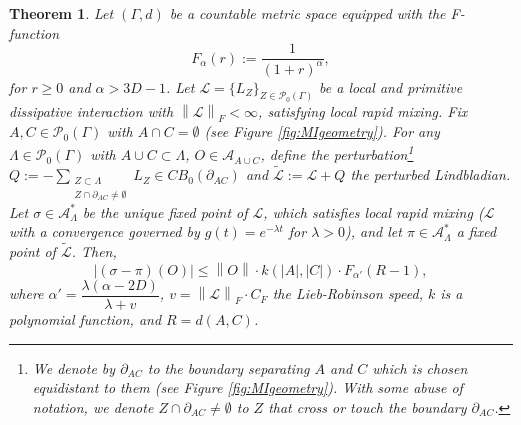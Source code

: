 \documentclass[10pt,a4paper]{amsart}
\newtheorem{thm}{Theorem}
\newcommand{\A}{\mathcal{A}}
\newcommand{\LL}{\widetilde{\Li}}
\newcommand{\La}{\Lambda}
\newcommand{\Li}{\mathcal{L}}
\newcommand{\abs}[1]{\left \vert#1\right\vert}
\newcommand{\norm}[1]{\left\lVert#1\right\rVert}
\newcommand{\normm}[2]{\left\lVert#1\right\rVert_{#2}}
\begin{document}
\begin{thm}\label{thm:clusteringBoundary}
    Let $(\Gamma,d)$ be a countable metric space equipped with the F-function\[F_\alpha(r):=\dfrac{1}{(1+r)^\alpha},\]for $r\geq0$ and $\alpha>3D-1$. Let $\Li=\{L_Z\}_{Z\in \mathcal{P}_0(\Gamma)}$ be a local and primitive dissipative interaction with $\normm{\Li}{F}<\infty$, satisfying local rapid mixing. Fix $A,C\in \mathcal{P}_0(\Gamma)$ with $A\cap C =\emptyset$ (see Figure \ref{fig:MIgeometry}). For any $\Lambda\in  \mathcal{P}_0(\Gamma)$ with $A\cup C \subset \Lambda$, $O\in \mathcal{A}_{A\cup C}$, define the perturbation\footnote{We denote by $\partial_{AC}$ to the boundary separating $A$ and $C$ which is chosen equidistant to them (see Figure \ref{fig:MIgeometry}). With some abuse of notation, we denote $Z\cap \partial_{AC}\neq \emptyset$ to $Z$ that cross or touch the boundary $\partial_{AC}$.} $Q:=-\sum\limits_{\substack{Z\subset \Lambda \\ Z\cap \partial_{AC}\neq \emptyset}}L_Z\in CB_0(\partial_{AC})$ and $\LL:=\Li+ Q $ the perturbed \textit{Lindbladian}.
Let $\sigma\in\A_\La^*$ be the unique fixed point of $\Li$, which satisfies local rapid mixing ($\Li$ with a convergence governed by $g(t)=e^{-\lambda t}$ for $\lambda >0$), and let $\pi\in\A_\La^*$ a fixed point of $\LL$. Then,
    \begin{equation}
        \abs{(\sigma-\pi)(O)}\leq \norm{O}\cdot  k(\abs{A},\abs{C})\cdot F_{\alpha '}(R-1),
    \end{equation}
    where $\alpha'=\dfrac{\lambda(\alpha-2D)}{\lambda +v}$, $v=\normm{\Li}{F}\cdot  C_F$ the Lieb-Robinson speed, $k$ is a polynomial function, and $R=d(A,C)$. 

\end{thm}
\end{document}
